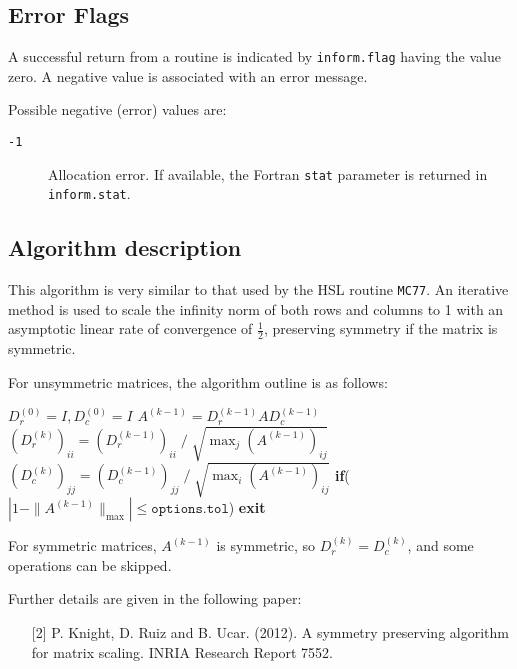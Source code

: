 \subsection{Error Flags} \label{returns:equilib}
A successful return from a routine is indicated by \texttt{inform.flag} having the value zero. A negative value is associated with an error message.

Possible negative (error) values are:
\begin{description}
\item[\texttt{-1}] Allocation error. If available, the Fortran \texttt{stat} parameter is returned in \texttt{inform.stat}.
\end{description}

\subsection{Algorithm description}

This algorithm is very similar to that used by the HSL routine \texttt{MC77}.
An iterative method
is used to scale the infinity norm of both rows and columns to 1 with an asymptotic linear rate of convergence of $\frac{1}{2}$, preserving symmetry if the matrix is symmetric.

\noindent
For unsymmetric matrices, the algorithm outline is as follows:
\begin{algorithmic}
   \setlength{\itemsep}{2pt}
   \STATE $D_r^{(0)} = I, D_c^{(0)}=I$
      \setlength{\itemsep}{2pt}
      \STATE $A^{(k-1)} = D_r^{(k-1)} A D_c^{(k-1)}$
      \STATE $(D_r^{(k)})_{ii} = (D_r^{(k-1)})_{ii}\; /\; \sqrt{\max_j(A^{(k-1)})_{ij}}$
      \STATE $(D_c^{(k)})_{jj} = (D_c^{(k-1)})_{jj}\; /\; \sqrt{\max_i(A^{(k-1)})_{ij}}$
      \STATE\textbf{if}($|1-\|A^{(k-1)}\|_{\max}|\le\texttt{options.tol}$) \textbf{exit}
   \ENDFOR
\end{algorithmic}
For symmetric matrices, $A^{(k-1)}$ is symmetric, so $D_r^{(k)} = D_c^{(k)}$, and
some operations can be skipped.

\vspace*{0.3cm}
\noindent
Further details are given in the following paper:
\vspace{-0.1cm}
\begin{itemize}
   \item[{[2]}] P. Knight, D. Ruiz and B. Ucar. (2012). A symmetry preserving algorithm for matrix scaling. INRIA Research Report 7552.
\end{itemize}

